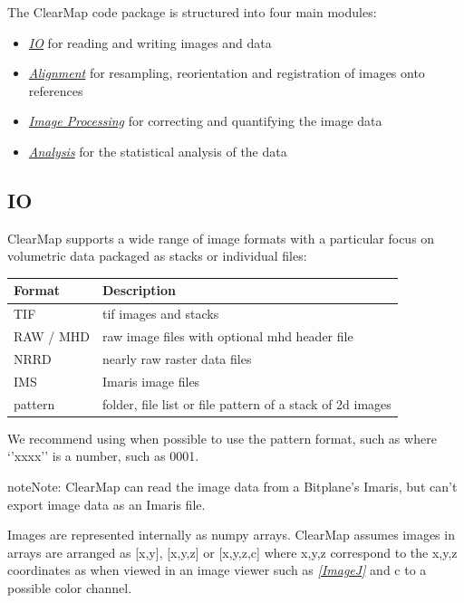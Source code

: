 \documentclass[letterpaper,10pt,english]{sphinxmanual}
\begin{document}
The ClearMap code package is structured into four main modules:
\begin{itemize}
\item {} 
{\hyperref[introduction:io]{\emph{IO}}} for reading and writing images and data

\item {} 
{\hyperref[introduction:alignment]{\emph{Alignment}}} for resampling, reorientation and registration of images onto references

\item {} 
{\hyperref[introduction:image-processing]{\emph{Image Processing}}} for correcting and quantifying the image data

\item {} 
{\hyperref[introduction:analysis]{\emph{Analysis}}} for the statistical analysis of the data

\end{itemize}


\subsection{IO}
\label{introduction:io}
ClearMap supports a wide range of image formats with a particular focus on volumetric data packaged as stacks or individual files:

\begin{tabulary}{\linewidth}{|L|L|}
\hline
\textsf{\relax 
Format
} & \textsf{\relax 
Description
}\\
\hline
TIF
 & 
tif images and stacks
\\
\hline
RAW / MHD
 & 
raw image files with optional mhd header file
\\
\hline
NRRD
 & 
nearly raw raster data files
\\
\hline
IMS
 & 
Imaris image files
\\
\hline
pattern
 & 
folder, file list or file pattern of a stack of 2d images
\\
\hline\end{tabulary}


We recommend using when possible to use the pattern format, such as  where ‘’xxxx’’ is a number, such as 0001.

\begin{notice}{note}{Note:}
ClearMap can read the image data from a Bitplane’s Imaris, but can’t export image data as an Imaris file.
\end{notice}

Images are represented internally as numpy arrays. ClearMap assumes images
in arrays are arranged as {[}x,y{]}, {[}x,y,z{]} or {[}x,y,z,c{]} where x,y,z correspond to
the x,y,z coordinates as when viewed in an image viewer such as \label{introduction:id1}{\hyperref[introduction:imagej]{\emph{{[}ImageJ{]}}}} and
c to a possible color channel.
\end{document}
